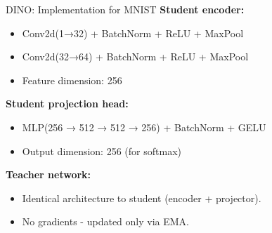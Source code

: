 \documentclass{beamer}
\begin{document}
\begin{frame}{DINO: Implementation for MNIST}
  \textbf{Student encoder:} 
  \vspace{0.3cm}
  \begin{itemize}
  \item Conv2d(1→32) + BatchNorm + ReLU + MaxPool
  \vspace{0.3cm}
  \item Conv2d(32→64) + BatchNorm + ReLU + MaxPool  
  \vspace{0.3cm}
  \item Feature dimension: 256
\end{itemize}

\vspace{0.5cm}

\textbf{Student projection head:}
  \vspace{0.3cm}
\begin{itemize}
\item MLP(256 → 512 → 512 → 256) + BatchNorm + GELU
  \vspace{0.3cm}
\item Output dimension: 256 (for softmax)
\end{itemize}

\vspace{0.5cm}

\textbf{Teacher network:}
  \vspace{0.3cm}
\begin{itemize}
\item \alert{Identical architecture} to student (encoder + projector).
\vspace{0.3cm}
\item \alert{No gradients} - updated only via EMA.
\end{itemize}
\end{frame}
\end{document}
